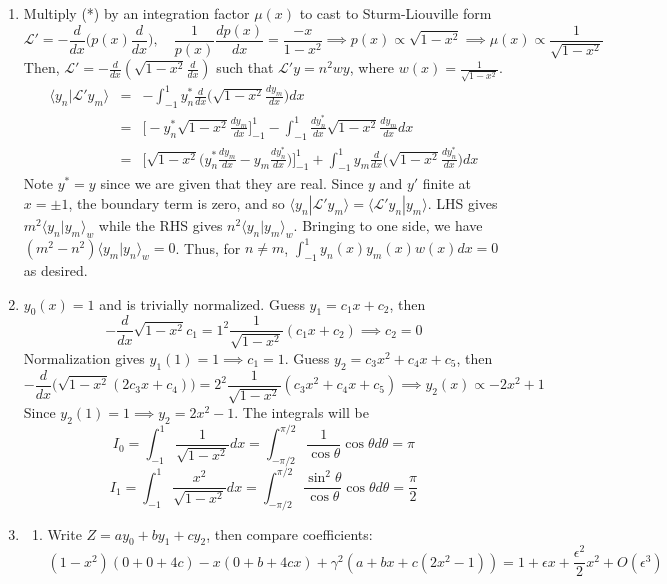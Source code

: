 \documentclass[a4paper]{article}
\begin{document}
\begin{ans}\leavevmode
\begin{enumerate}[label=(\alph*)]
\item
Multiply (*) by an integration factor $\mu(x)$ to cast to Sturm-Liouville form $$\mathcal{L'}=-\frac{d}{dx}\bigg(p(x)\frac{d}{dx}\bigg),\quad \frac{1}{p(x)}\frac{dp(x)}{dx}=\frac{-x}{1-x^2}\implies p(x)\propto\sqrt{1-x^2}\implies\mu(x)\propto\frac{1}{\sqrt{1-x^2}}$$
Then, $\mathcal{L}'=-\frac{d}{dx}(\sqrt{1-x^2}\frac{d}{dx})$ such that $\mathcal{L}'y=n^2wy$, where $w(x)=\frac{1}{\sqrt{1-x^2}}$.
\begin{eqnarray}
\langle y_n|\mathcal{L}'y_m\rangle&=&-\int_{-1}^1 y_n^*\frac{d}{dx}\bigg(\sqrt{1-x^2}\frac{dy_m}{dx}\bigg)dx\nonumber\\&=&\bigg[-y_n^*\sqrt{1-x^2}\frac{dy_m}{dx}\bigg]_{-1}^1-\int_{-1}^1 \frac{dy_n^*}{dx}\sqrt{1-x^2}\frac{dy_m}{dx}dx\nonumber\\&=&\bigg[\sqrt{1-x^2}\bigg(y_n^*\frac{dy_m}{dx}-y_m\frac{dy_n^*}{dx}\bigg)\bigg]_{-1}^1+\int_{-1}^1 y_m\frac{d}{dx}\bigg(\sqrt{1-x^2}\frac{dy_n^*}{dx}\bigg)dx\nonumber
\end{eqnarray}
Note $y^*=y$ since we are given that they are real. Since $y$ and $y'$ finite at $x=\pm 1$, the boundary term is zero, and so $\langle y_n|\mathcal{L}'y_m\rangle=\langle\mathcal{L}'y_n|y_m\rangle$. LHS gives $m^2\langle y_n|y_m\rangle_w$ while the RHS gives $n^2\langle y_n|y_m\rangle_w$. Bringing to one side, we have $(m^2-n^2)\langle y_m|y_n\rangle_w=0$. Thus, for $n\neq m$, $\int_{-1}^1y_n(x)y_m(x)w(x)dx=0$ as desired.
\item $y_0(x)=1$ and is trivially normalized. Guess $y_1=c_1x+c_2$, then
$$-\frac{d}{dx}\sqrt{1-x^2}c_1=1^2\frac{1}{\sqrt{1-x^2}}(c_1x+c_2)\implies c_2=0$$
Normalization gives $y_1(1)=1\implies c_1=1$. Guess $y_2=c_3x^2+c_4x+c_5$, then
$$-\frac{d}{dx}\bigg(\sqrt{1-x^2}(2c_3x+c_4)\bigg)=2^2\frac{1}{\sqrt{1-x^2}}(c_3x^2+c_4x+c_5)\implies y_2(x)\propto -2x^2+1$$
Since $y_2(1)=1\implies y_2=2x^2-1$. The integrals will be
$$I_0=\int_{-1}^1\frac{1}{\sqrt{1-x^2}}dx=\int_{-\pi/2}^{\pi/2}\frac{1}{\cos\theta}\cos\theta d\theta=\pi$$
$$I_1=\int_{-1}^1\frac{x^2}{\sqrt{1-x^2}}dx=\int_{-\pi/2}^{\pi/2}\frac{\sin^2\theta}{\cos\theta}\cos\theta d\theta=\frac{\pi}{2}$$
\item 
\begin{enumerate}[label=(\roman*)]
\item Write $Z=ay_0+by_1+cy_2$, then compare coefficients:
$$(1-x^2)(0+0+4c)-x(0+b+4cx)+\gamma^2(a+bx+c(2x^2-1))=1+\epsilon x+\frac{\epsilon^2}{2}x^2+O(\epsilon^3)$$

\end{enumerate}
\end{enumerate}
\end{ans}
\end{document}
